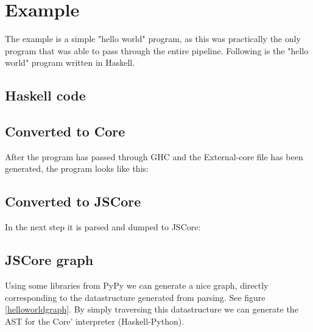 
\section{Example}

The example is a simple "hello world" program, as this was practically
the only program that was able to pass through the entire pipeline. Following
is the "hello world" program written in Haskell.

\subsection{Haskell code}



\subsection{Converted to Core}

After the program has passed through GHC and the External-core file
has been generated, the program looks like this:



\subsection{Converted to JSCore}

In the next step it is parsed and dumped to JSCore:



\subsection{JSCore graph}

Using some libraries from PyPy we can generate a nice graph,
directly corresponding to the datastructure generated from parsing. 
See figure \ref{helloworldgraph}.
By simply traversing this datastructure we can generate the AST for the Core' 
interpreter (Haskell-Python).


